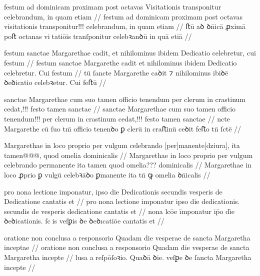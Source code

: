 \ex \bg
\gla
{}
festum ad dominicam proximam post octavas Visitationis transponitur celebrandum, in quam etiam
//
\glRekonstrukcja
{}
festum ad dominicam proximam post octavas visitationis transponitur!!! celebrandum, in quam etiam
//
\glU
{}
ﬅū aꝺ ꝺn̄icā ꝓximā poﬅ octanas vitatiōis tranſponitur celebꝛanꝺū in quā etiā
//
\endgl
\xe



\ex \bg
\gla
{}
festum sanctae Margarethae cadit,
et nihilominus ibidem Dedicatio celebretur, cui festum
//
\glRekonstrukcja
{}
festum sanctae Margarethe cadit
et nihilominus ibidem Dedicatio celebretur. Cui festum
//
\glU
{}
tū ſancte Margarethe caꝺit ⁊ nihilominus ibiꝺē ꝺeꝺicatio celebꝛetur. Cui feﬅū
//
\endgl
\xe



\ex \bg
\gla
{}
sanctae Margarethae cum suo tamen officio tenendum per clerum in crastinum cedat,!!!
festo tamen sanctae
//
\glRekonstrukcja
{}
sanctae Margarethae cum suo tamen officio tenendum!!! per clerum in crastinum cedat,!!!
festo tamen sanctae
//
\glU
{}
ncte Margarethe cū ſuo tm̄ oﬀicio tenenꝺo ꝑ clerū in craﬅinū ceꝺit feﬅo tn̄ ſctē
//
\endgl
\xe



\ex \bg
\gla
{}
Margarethae in loco proprio per vulgum celebrando
[per]manente[dziura], ita tamen@@@, quod omelia dominicalis
//
\glRekonstrukcja
{}
Margarethae in loco proprio per vulgum celebrando
permanente ita tamen quod omelia??? dominicalis
//
\glU
{}
Margarethae in loco ꝓprio ꝑ vulgū celebꝛāꝺo ꝑmanente ita tn̄ ꝙ omelia ꝺn̄icalis
//
\endgl
\xe



\ex \bg
\gla
{}
pro nona lectione
imponatur, ipso die Dedicationis secundis {} vesperis de Dedicatione cantatis et
//
\glRekonstrukcja
{}
pro nona lectione
imponatur ipso die dedicationis. secundis de vesperis {} dedicatione cantatis et
//
\glU
{}
 nona lcōe īmponatur ip̄o dìe ꝺeꝺicationis. ſcis {} veſꝑis  ꝺe ꝺeꝺıcatiōe cantatis et
//
\endgl
\xe



\ex \bg
\gla
{}
oratione non conclusa a responsorio Quadam die vesperae de
sancta Margaretha inceptae
//
\glRekonstrukcja
{}
oratione non conclusa a responsorio Quadam die vesperae de
sancta Margaretha incepte
//
\glU
{}
  lusa a reſpōſoꝛio. Quaꝺā ꝺie. veſꝑe ꝺe ſancta Margaretha incepte
//
\endgl
\xe



